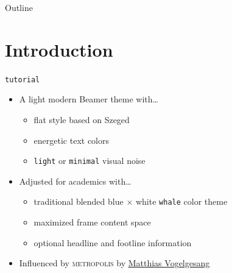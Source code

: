 \documentclass{beamer}%
\title[Title]{\theme}%
\subtitle[Subtitle]{A light Beamer theme for academics}
\author[Author]{Jeff M Xu}
\institute[Institute]{\href{https://github.com/jeffmxu}{\texttt{github.com/jeffmxu}}}
\newcommand{\theme}{\texttt{tutorial}}
\begin{document}
\begin{frame}
	\maketitle%
\end{frame}
\begin{frame}{Outline}
	\tableofcontents%
\end{frame}



\section{Introduction}
\begin{frame}{\theme}
\begin{itemize}
\item A light modern Beamer theme with\ldots
	\begin{itemize}
	\item flat style based on Szeged
	\item energetic text colors
	\item \texttt{light} or \texttt{minimal} visual noise
	\end{itemize}
\item Adjusted for academics with\ldots
	\begin{itemize}
	\item traditional \textcolor{BlendedBlue}{blended blue} $\times$ white \texttt{whale} color theme
	\item maximized frame content space
	\item optional headline and footline information
	\end{itemize}
\item Influenced by \textsc{metropolis} by \href{http://github.com/matze}{Matthias Vogelgesang}
\end{itemize}
\end{frame}
\end{document}
